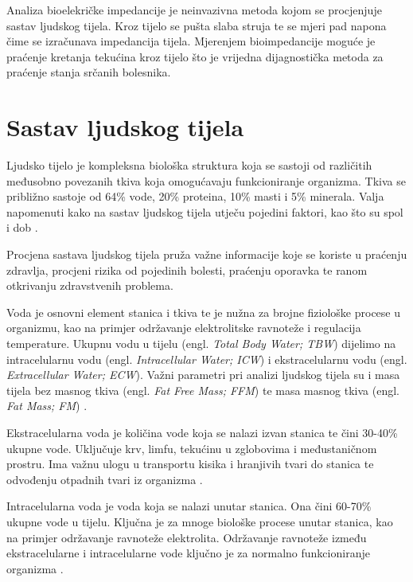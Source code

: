 \documentclass[../diplomski_rad.tex]{subfiles}
\begin{document}
\sloppy

\justifying

Analiza bioelekričke impedancije je neinvazivna metoda kojom se procjenjuje sastav ljudskog tijela. 
Kroz tijelo se pušta slaba struja te se mjeri pad napona čime se izračunava impedancija tijela. 
Mjerenjem bioimpedancije moguće je praćenje kretanja tekućina kroz tijelo što je vrijedna dijagnostička metoda za praćenje stanja srčanih bolesnika. 

\section{Sastav ljudskog tijela}

Ljudsko tijelo je kompleksna biološka struktura koja se sastoji od različitih međusobno povezanih tkiva koja 
omogućavaju funkcioniranje organizma. Tkiva se približno sastoje od 
64\% vode,
20\% proteina,
10\% masti 
i 5\% minerala. 
Valja napomenuti kako na sastav ljudskog tijela utječu pojedini faktori, kao što su spol i dob \cite{Bera2014}.  

Procjena sastava ljudskog tijela pruža važne informacije koje se koriste u praćenju zdravlja, 
procjeni rizika od pojedinih bolesti, praćenju oporavka te ranom otkrivanju zdravstvenih problema. 

Voda je osnovni element stanica i tkiva te je nužna za brojne fiziološke procese u organizmu, 
kao na primjer održavanje elektrolitske ravnoteže i regulacija temperature.
Ukupnu vodu u tijelu (engl. \textit{Total Body Water; TBW}) 
dijelimo na intracelularnu vodu (engl. \textit{Intracellular Water; ICW}) i ekstracelularnu vodu (engl. \textit{Extracellular Water; ECW}). 
Važni parametri pri analizi ljudskog tijela su i masa tijela bez masnog tkiva (engl. \textit{Fat Free Mass; FFM}) 
te masa masnog tkiva (engl. \textit{Fat Mass; FM}) \cite{Bera2014}.

Ekstracelularna voda je količina vode koja se nalazi izvan stanica te čini 30-40\% ukupne vode. Uključuje krv, limfu, tekućinu u 
zglobovima i međustaničnom prostru. Ima važnu ulogu u transportu kisika i hranjivih tvari do stanica te odvođenju otpadnih 
tvari iz organizma \cite{Bera2014}.

Intracelularna voda je voda koja se nalazi unutar stanica. Ona čini 60-70\% ukupne vode u tijelu. 
Ključna je za mnoge biološke procese unutar stanica, kao na primjer održavanje ravnoteže elektrolita. 
Održavanje ravnoteže između ekstracelularne i intracelularne vode ključno je za normalno funkcioniranje organizma \cite{Bera2014}.
\end{document}
